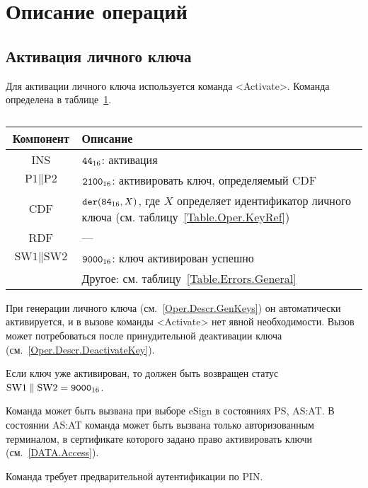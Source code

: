 \section{Описание операций}\label{Oper.Descr}

\subsection{Активация личного ключа}\label{Oper.Descr.ActivateKey}

Для активации личного ключа используется команда <Activate>.
Команда определена в таблице~\ref{Table.Oper.ActivateCmd}.

\begin{table}[h!]
\caption{}\label{Table.Oper.ActivateCmd}
\begin{tabular}{|c|p{14cm}|}
\hline
Компонент & Описание\\
\hline
\hline
INS & $\texttt{44}_{16}$: активация\\
\hline
$\text{P1} \parallel \text{P2}$ & $\texttt{2100}_{16}$: 
активировать ключ, определяемый CDF\\
\hline
CDF &  $\texttt{der}(\texttt{84}_{16}, X)$,   
где $X$ определяет идентификатор личного ключа 
(см. таблицу~\ref{Table.Oper.KeyRef}) \\ 
\hline
\hline
RDF &  --- \\
\hline
$\text{SW1} \parallel \text{SW2}$ & $\texttt{9000}_{16}$: ключ активирован успешно \\
\cline{2-2}
  & Другое: см. таблицу~\ref{Table.Errors.General} \\
\hline
\end{tabular}
\end{table}

При генерации личного ключа (см.~\ref{Oper.Descr.GenKeys})
он автоматически активируется, и в вызове команды <Activate> нет явной 
необходимости. Вызов может потребоваться после принудительной деактивации ключа 
(см.~\ref{Oper.Descr.DeactivateKey}).

Если ключ уже активирован, то должен быть 
возвращен статус $\text{SW1} \parallel \text{SW2} = \texttt{9000}_{16}$.

Команда может быть вызвана при выборе eSign в состояниях PS, AS:AT. В состоянии 
AS:AT команда может быть вызвана только авторизованным терминалом, в 
сертификате которого задано право активировать ключи (см.~\ref{DATA.Access}). 

Команда требует предварительной аутентификации по PIN.


